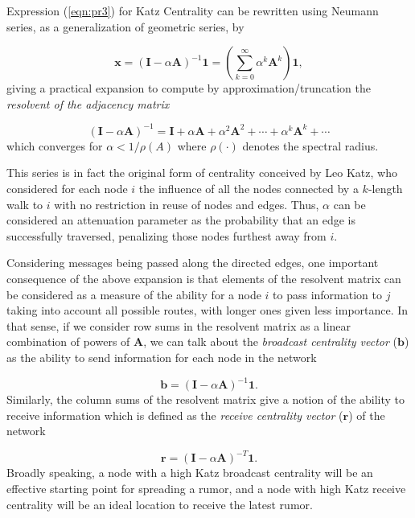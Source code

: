 Expression (\ref{eqn:pr3}) for Katz Centrality can be rewritten using Neumann series, as a generalization of geometric series, by

\begin{equation}
\label{eqn:katz2}
    \mathbf{x}=(\mathbf{I}-\alpha\mathbf{A})^{-1}\mathbf{1}=\left(\sum_{k=0}^{\infty}\alpha^k \mathbf{A}^k\right)\mathbf{1},
\end{equation}
giving a practical expansion to compute by approximation/truncation the \textit{resolvent of the adjacency matrix} 

\begin{equation}
\label{eqn:katz3}
    (\mathbf{I}-\alpha\mathbf{A})^{-1} = \mathbf{I} + \alpha\mathbf{A} + \alpha^2\mathbf{A}^2 + \cdots + \alpha^k\mathbf{A}^k + \cdots
\end{equation}
which converges for $\alpha<1/\rho(A)$ where $\rho(\cdot)$ denotes the spectral radius. 

This series is in fact the original form of centrality conceived by Leo Katz, who considered for each node $i$ the influence of all the nodes connected by a $k$-length walk to $i$ with no restriction in reuse of nodes and edges. Thus, $\alpha$ can be considered an attenuation parameter as the probability that an edge is successfully traversed, penalizing those nodes furthest away from $i$. 

Considering messages being passed along the directed edges, one important consequence of the above expansion is that elements of the resolvent matrix can be considered as a measure of the ability for a node $i$ to pass information to $j$ taking into account all possible routes, with longer ones given less importance. In that sense, if we consider row sums in the resolvent matrix as a linear combination of powers of $\mathbf{A}$, we can talk about the \textit{broadcast centrality vector} ($\mathbf{b}$) as the ability to send information for each node in the network 

\begin{equation}
\label{eqn:broad}
    \mathbf{b}=(\mathbf{I}-\alpha\mathbf{A})^{-1} \mathbf{1}.
\end{equation}
Similarly, the column sums of the resolvent matrix give a notion of the ability to receive information which is defined as the \textit{receive centrality vector} ($\mathbf{r}$) of the network

\begin{equation}
\label{eqn:receiv}
    \mathbf{r} = (\mathbf{I}-\alpha\mathbf{A})^{-T} \mathbf{1}.
\end{equation}
Broadly speaking, a node with a high Katz broadcast centrality will be an effective starting point for spreading a rumor, and a node with high Katz receive centrality will be an ideal location to receive the latest rumor.

